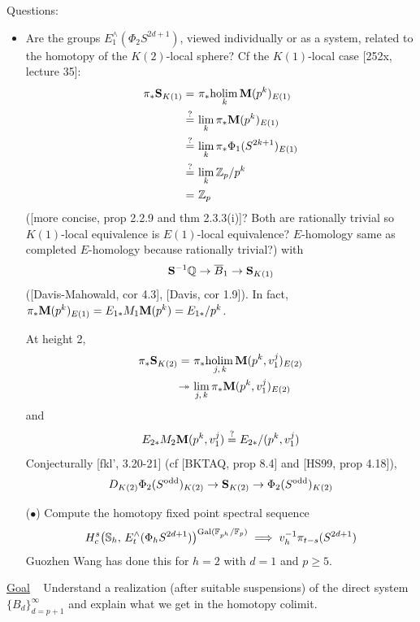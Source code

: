 \documentclass{rs}
\theoremstyle{definition}
\theoremstyle{remark}
\newcommand{\mb}[1]{\mathbb{#1}}
\newcommand{\holim}{{\rm holim}\,}
\newcommand{\Gal}{{\rm Gal}}
\newcommand{\bm}{{\bf M}}
\newcommand{\bs}{{\bf S}}
\newcommand{\BF}{{\mb F}}
\newcommand{\BQ}{{\mb Q}}
\newcommand{\BS}{{\mb S}}
\newcommand{\BZ}{{\mb Z}}
\newcommand{\surj}{\twoheadrightarrow}
\renewcommand{\=}{\approx}
\renewcommand{\-}{\sim}
\numberwithin{equation}{section}
\numberwithin{thm}{section}
\begin{document}
Questions: 
\begin{itemize}
 \item Are the groups $E^\wedge_1(\Phi_2 S^{2 d + 1})$, viewed individually or as a system, 
 related to the homotopy of the $K(2)$-local sphere?  Cf the $K(1)$-local case [252x, lecture 35]: 
 \[
  \begin{split}
   \pi_* \bs_{K(1)} = & ~ \pi_* \underset{k}{\holim} \bm(p^k)_{E(1)} \\
      \stackrel{?}{=} & ~ \underset{k}{\lim} \, \pi_* \bm(p^k)_{E(1)} \\
      \stackrel{?}{=} & ~ \underset{k}{\lim} \, \pi_* \Phi_1(S^{2 k + 1})_{E(1)} \\
      \stackrel{?}{=} & ~ \underset{k}{\lim} \, \BZ_p / p^k \\
                    = & ~ \BZ_p 
  \end{split}
 \]
 ([more concise, prop 2.2.9 and thm 2.3.3(i)]?  
 Both are rationally trivial so $K(1)$-local equivalence is $E(1)$-local equivalence?  
 $E$-homology same as completed $E$-homology because rationally trivial?) 
 with 
 \[
  \bs^{-1} \BQ \to \overline{B}_1 \to \bs_{K(1)} 
 \]
 ([Davis-Mahowald, cor 4.3], [Davis, cor 1.9]).  
 In fact, $\pi_* \bm(p^k)_{E(1)} = E_{1*} M_1 \bm(p^k) = E_{1*} / p^k$.  

 At height 2, 
 \[
  \begin{split}
   \pi_* \bs_{K(2)} = & ~ \pi_* \underset{j, \, k}{\holim} \bm(p^k, v_1^j)_{E(2)} \\
                \surj & ~ \underset{j, \, k}{\lim} \, \pi_* \bm(p^k, v_1^j)_{E(2)} 
  \end{split}
 \]
 and 
 \[
  E_{2*} M_2 \bm(p^k, v_1^j) \stackrel{?}{=} E_{2*} / (p^k, v_1^j) 
 \]
 Conjecturally [fkl', 3.20-21] (cf [BKTAQ, prop 8.4] and [HS99, prop 4.18]), 
 \[
  D_{K(2)} \Phi_2(S^{\rm odd})_{K(2)} \to \bs_{K(2)} \to \Phi_2(S^{\rm odd})_{K(2)} 
 \]

 \item [($\bullet$)] Compute the homotopy fixed point spectral sequence 
 \[
  H_c^s \big(\BS_h, \, E^\wedge_t(\Phi_h S^{2 d + 1})\big)^{\Gal(\BF_{p^h} / \BF_p)} \implies v_h^{-1} \pi_{t - s}(S^{2 d + 1}) 
 \]
 Guozhen Wang has done this for $h=2$ with $d = 1$ and $p \geq 5$.  \\
\end{itemize}

\underline{Goal} ~ Understand a realization (after suitable suspensions) of the direct system $\{B_d\}_{d = p + 1}^\infty$ 
and explain what we get in the homotopy colimit.  
\end{document}
